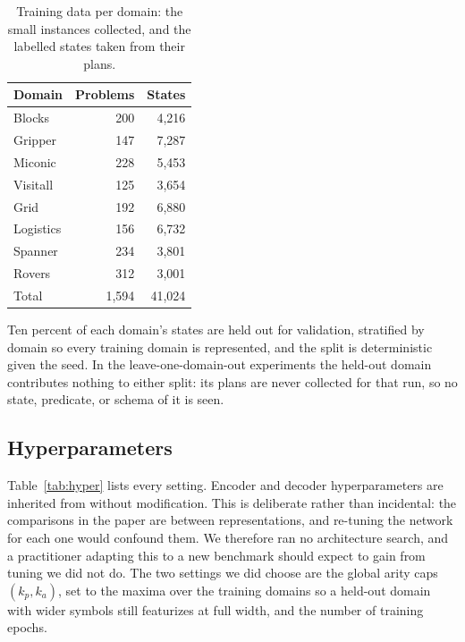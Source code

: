\documentclass[letterpaper]{article}
\begin{document}
\begin{table}[t]
\small
\centering
\caption{Training data per domain: the small instances collected, and the
labelled states taken from their plans.}
\label{tab:data}
\begin{tabular}{@{}lrr@{}}
\toprule
Domain & Problems & States \\
\midrule
Blocks     & 200 & 4{,}216 \\
Gripper    & 147 & 7{,}287 \\
Miconic    & 228 & 5{,}453 \\
Visitall   & 125 & 3{,}654 \\
Grid       & 192 & 6{,}880 \\
Logistics  & 156 & 6{,}732 \\
Spanner    & 234 & 3{,}801 \\
Rovers     & 312 & 3{,}001 \\
\midrule
Total      & 1{,}594 & 41{,}024 \\
\bottomrule
\end{tabular}
\end{table}

Ten percent of each domain's states are held out for validation, stratified
by domain so every training domain is represented, and the split is
deterministic given the seed. In the leave-one-domain-out experiments the
held-out domain contributes nothing to either split: its plans are never
collected for that run, so no state, predicate, or schema of it is seen.

\subsection{Hyperparameters}
\label{app:hyper}

Table~\ref{tab:hyper} lists every setting. Encoder and decoder
hyperparameters are inherited from \citet{gabar} without modification. This
is deliberate rather than incidental: the comparisons in the paper are
between representations, and re-tuning the network for each one would
confound them. We therefore ran no architecture search, and a practitioner
adapting this to a new benchmark should expect to gain from tuning we did not
do. The two settings we did choose are the global arity caps $(k_p, k_a)$,
set to the maxima over the training domains so a held-out domain with wider
symbols still featurizes at full width, and the number of training epochs.
\end{document}
